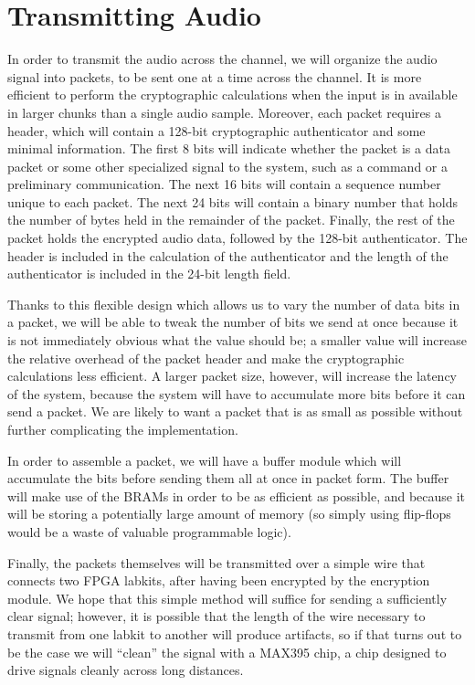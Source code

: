 \documentclass[a4paper]{report}
\begin{document}
\section{Transmitting Audio}

In order to transmit the audio across the channel, we will organize the audio
signal into packets, to be sent one at a time across the channel. It is more
efficient to perform the cryptographic calculations when the input is in
available in larger chunks than a single audio sample. Moreover, each packet
requires a header, which will contain a 128-bit cryptographic authenticator and
some minimal information. The first 8 bits will indicate whether the packet
is a data packet or some other specialized signal to the system, such as a
command or a preliminary communication. The next 16 bits will contain a sequence
number unique to each packet. The next 24 bits will contain a binary number that
holds the number of bytes held in the remainder of the packet.  Finally, the
rest of the packet holds the encrypted audio data, followed by the 128-bit
authenticator. The header is included in the calculation of the authenticator
and the length of the authenticator is included in the 24-bit length field.

Thanks to this flexible design which allows us to vary the number of data bits
in a packet, we will be able to tweak the number of bits we send at once because
it is not immediately obvious what the value should be; a smaller value will
increase the relative overhead of the packet header and make the cryptographic
calculations less efficient. A larger packet size, however, will increase the
latency of the system, because the system will have to accumulate more bits
before it can send a packet. We are likely to want a packet that is as small as
possible without further complicating the implementation.

In order to assemble a packet, we will have a buffer module which will
accumulate the bits before sending them all at once in packet form. The buffer
will make use of the BRAMs in order to be as efficient as possible, and because
it will be storing a potentially large amount of memory (so simply using
flip-flops would be a waste of valuable programmable logic).

Finally, the packets themselves will be transmitted over a simple wire that
connects two FPGA labkits, after having been encrypted by the encryption module.
We hope that this simple method will suffice for sending a sufficiently clear
signal; however, it is possible that the length of the wire necessary to
transmit from one labkit to another will produce artifacts, so if that turns out
to be the case we will ``clean'' the signal with a MAX395 chip, a chip designed
to drive signals cleanly across long distances.
\end{document}
